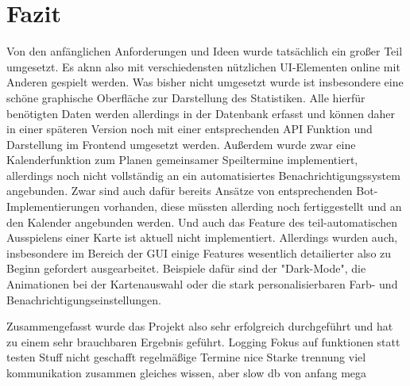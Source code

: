 \chapter{Fazit}
Von den anfänglichen Anforderungen und Ideen wurde tatsächlich ein großer Teil umgesetzt. Es aknn also mit verschiedensten nützlichen UI-Elementen online mit Anderen gespielt werden. Was bisher nicht umgesetzt wurde ist insbesondere eine schöne graphische Oberfläche zur Darstellung des Statistiken. Alle hierfür benötigten Daten werden allerdings in der Datenbank erfasst und können daher in einer späteren Version noch mit einer entsprechenden API Funktion und Darstellung im Frontend umgesetzt werden. Außerdem wurde zwar eine Kalenderfunktion zum Planen gemeinsamer Speiltermine implementiert, allerdings noch nicht vollständig an ein automatisiertes Benachrichtigungssystem angebunden. Zwar sind auch dafür bereits Ansätze von entsprechenden Bot-Implementierungen vorhanden, diese müssten allerding noch fertiggestellt und an den Kalender angebunden werden. Und auch das Feature des teil-automatischen Ausspielens einer Karte ist aktuell nicht implementiert. Allerdings wurden auch, insbesondere im Bereich der GUI einige Features wesentlich detailierter also zu Beginn gefordert ausgearbeitet. Beispiele dafür sind der "Dark-Mode", die Animationen bei der Kartenauswahl oder die stark personalisierbaren Farb- und Benachrichtigungseinstellungen.

Zusammengefasst wurde das Projekt also sehr erfolgreich durchgeführt und hat zu einem sehr brauchbaren Ergebnis geführt. 
Logging
Fokus auf funktionen statt testen
Stuff nicht geschafft
regelmäßige Termine nice
Starke trennung viel kommunikation
zusammen gleiches wissen, aber slow
db von anfang mega

